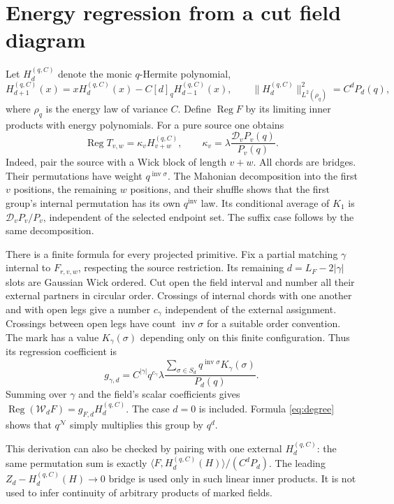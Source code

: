 \documentclass[11pt]{article}
\newcommand{\WW}{\mathcal W}
\newcommand{\NN}{\mathcal N}
\newcommand{\HH}{H^{(q,C)}}
\newcommand{\inv}{\operatorname{inv}}
\newcommand{\Reg}{\operatorname{Reg}}
\begin{document}
\section{Energy regression from a cut field diagram}
Let $\HH_d$ denote the monic $q$-Hermite polynomial,
\begin{equation}
 \HH_{d+1}(x)=x\HH_d(x)-C[d]_q\HH_{d-1}(x),
 \qquad \|\HH_d\|_{L^2(\rho_q)}^2=C^dP_d(q),
\end{equation}
where $\rho_q$ is the energy law of variance $C$.
Define $\Reg F$ by its limiting inner products with energy
polynomials. For a pure source one obtains
\begin{equation}
 \boxed{\quad \Reg T_{v,w}=\kappa_v\HH_{v+w},\qquad
 \kappa_v=\lambda\frac{\mathcal D_vP_v(q)}{P_v(q)}.\quad}
 \label{eq:source-reg}
\end{equation}
Indeed, pair the source with a Wick block of length $v+w$.
All chords are bridges. Their permutations have weight
$q^{\inv\sigma}$. The Mahonian decomposition into the first $v$
positions, the remaining $w$ positions, and their shuffle shows
that the first group's internal permutation has its own
$q^{\inv}$ law. Its conditional average of $K_1$ is
$\mathcal D_vP_v/P_v$, independent of the selected endpoint set.
The suffix case follows by the same decomposition.

There is a finite formula for every projected primitive. Fix a
partial matching $\gamma$ internal to $F_{r,v,w}$, respecting
the source restriction. Its remaining $d=L_F-2|\gamma|$ slots are
Gaussian Wick ordered. Cut open the field interval and number all
their external partners in circular order. Crossings of internal
chords with one another and with open legs give a number $c_\gamma$
independent of the external assignment. Crossings between open
legs have count $\inv\sigma$ for a suitable order convention.
The mark has a value $K_\gamma(\sigma)$ depending only on this
finite configuration. Thus its regression coefficient is
\begin{equation}
 g_{\gamma,d}=C^{|\gamma|}q^{c_\gamma}\lambda
 \frac{\sum_{\sigma\in S_d}q^{\inv\sigma}K_\gamma(\sigma)}{P_d(q)}.
 \label{eq:cut-reg}
\end{equation}
Summing over $\gamma$ and the field's scalar coefficients gives
$\Reg(\WW_dF)=g_{F,d}\HH_d$. The case $d=0$ is included.
Formula \eqref{eq:degree} shows that $q^{\NN}$ simply multiplies
this group by $q^d$.

This derivation can also be checked by pairing with one external
$\HH_d$: the same permutation sum is exactly
$\langle F,\HH_d(H)\rangle/(C^dP_d)$.
The leading $Z_d-\HH_d(H)\to0$ bridge is used only in such linear
inner products. It is not used to infer continuity of arbitrary
products of marked fields.
\end{document}
